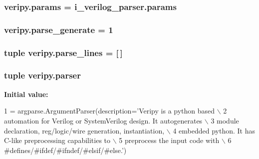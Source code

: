 \hypertarget{namespaceveripy_ab652869357ad8a97cd180a20659d3647}{
\subsubsection[{params}]{\setlength{\rightskip}{0pt plus 5cm}veripy.\-params = i\-\_\-verilog\-\_\-parser.\-params}}\label{namespaceveripy_ab652869357ad8a97cd180a20659d3647}
\hypertarget{namespaceveripy_a5d3c8544e0b626679631fadceac2ccb8}{
\subsubsection[{parse\-\_\-generate}]{\setlength{\rightskip}{0pt plus 5cm}veripy.\-parse\-\_\-generate = 1}}\label{namespaceveripy_a5d3c8544e0b626679631fadceac2ccb8}
\hypertarget{namespaceveripy_ac8745bd52ea5cd5e91036dc31970af88}{
\subsubsection[{parse\-\_\-lines}]{\setlength{\rightskip}{0pt plus 5cm}tuple veripy.\-parse\-\_\-lines = \mbox{[}$\,$\mbox{]}}}\label{namespaceveripy_ac8745bd52ea5cd5e91036dc31970af88}
\hypertarget{namespaceveripy_a72fa9052a62ff431aca57cfc30c24cf5}{
\subsubsection[{parser}]{\setlength{\rightskip}{0pt plus 5cm}tuple veripy.\-parser}}\label{namespaceveripy_a72fa9052a62ff431aca57cfc30c24cf5}
{\bfseries Initial value\-:}
\begin{DoxyCode}
1 = argparse.ArgumentParser(description=\textcolor{stringliteral}{'Veripy is a python based \(\backslash\)}
2 \textcolor{stringliteral}{            automation for Verilog or SystemVerilog design. It autogenerates \(\backslash\)}
3 \textcolor{stringliteral}{            module declaration, reg/logic/wire generation, instantiation, \(\backslash\)}
4 \textcolor{stringliteral}{            embedded python. It has C-like preprocessing capabilities to \(\backslash\)}
5 \textcolor{stringliteral}{            preprocess the input code with \(\backslash\)}
6 \textcolor{stringliteral}{            #defines/#ifdef/#ifndef/#elsif/#else.'})
\end{DoxyCode}


